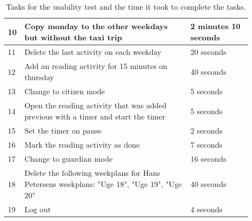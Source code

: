 \begin{table}[H]
\begin{tabular}{|p{1.3cm}|p{10cm}|p{1.7cm}|}
    10 & Copy monday to the other weekdays but without the taxi trip                                                             & 2 minutes 10 seconds     \\ \hline
    11 & Delete the last activity on each weekday                                                                                        & 20 seconds    \\ \hline
    12 & Add an reading activity for 15 minutes on thursday                                                                          & 40 seconds        \\ \hline
    13 & Change to citizen mode                                                                                                       &  5 seconds           \\ \hline
    14 & Open the reading activity that was added previous with a timer and start the timer                                            & 5 seconds        \\ \hline
    15 & Set the timer on pause                                                                                                        & 2 seconds        \\ \hline
    16 & Mark the reading activity as done                                                                                             & 7 seconds         \\ \hline
    17 & Change to guardian mode                                                                                                         & 16 seconds      \\ \hline
    18 & Delete the following weekplans for Hans Petersens weekplans: "Uge 18", "Uge 19", "Uge 20"                                       & 40 seconds   \\ \hline
    19 & Log out                                                                                                                    &  4 seconds                                                                                                             \\ \hline    \end{tabular}
    \caption{Tasks for the usability test and the time it took to complete the tasks.}\label{table:usability_tasks}
\end{table}

\newpage

